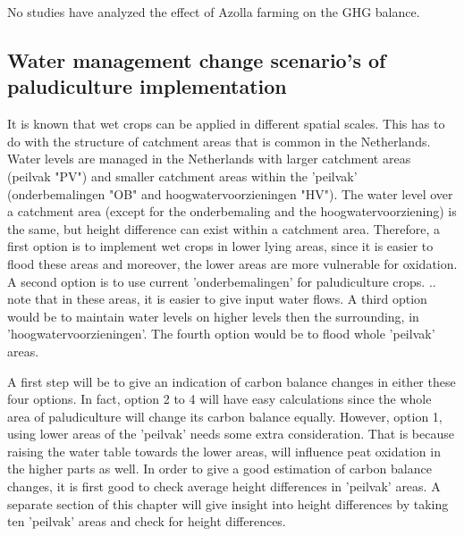 \documentclass[12pt,a4paper,titlepage]{article}
\begin{document}
No studies have analyzed the effect of Azolla farming on the GHG balance. 

\subsection{Water management change scenario's of paludiculture implementation}


It is known that wet crops can be applied in different spatial scales. This has to do with the structure of catchment areas that is common in the Netherlands. Water levels are managed in the Netherlands with larger catchment areas (peilvak "PV") and smaller catchment areas within the 'peilvak' (onderbemalingen "OB" and hoogwatervoorzieningen "HV"). The water level over a catchment area (except for the onderbemaling and the hoogwatervoorziening) is the same, but height difference can exist within a catchment area. Therefore, a first option is to implement wet crops in lower lying areas, since it is easier to flood these areas and moreover, the lower areas are more vulnerable for oxidation. A second option is to use current 'onderbemalingen' for paludiculture crops. .. note that in these areas, it is easier to give input water flows. A third option would be to maintain water levels on higher levels then the surrounding, in 'hoogwatervoorzieningen'. The fourth option would be to flood whole 'peilvak' areas. 

A first step will be to give an indication of carbon balance changes in either these four options. In fact, option 2 to 4 will have easy calculations since the whole area of paludiculture will change its carbon balance equally. However, option 1, using lower areas of the 'peilvak' needs some extra consideration. That is because raising the water table towards the lower areas, will influence peat oxidation in the higher parts as well. In order to give a good estimation of carbon balance changes, it is first good to check average height differences in 'peilvak' areas. A separate section of this chapter will give insight into height differences by taking ten 'peilvak' areas and check for height differences.
\end{document}
